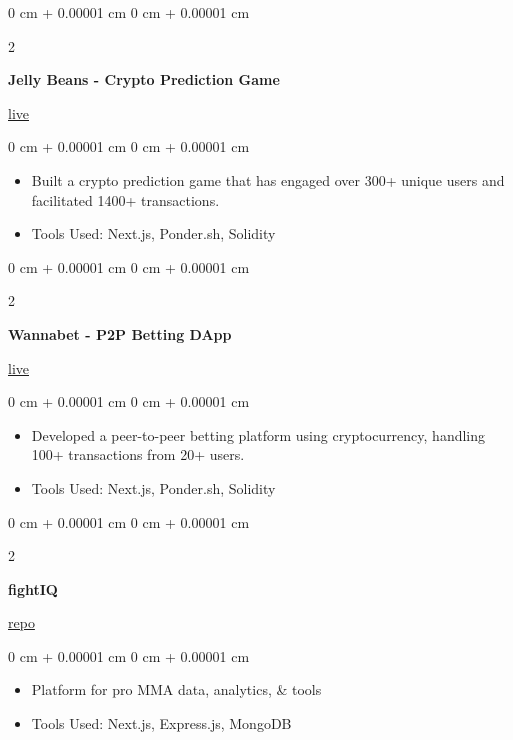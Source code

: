 \documentclass[10pt, letterpaper]{article}
\newenvironment{highlights}{
    \begin{itemize}[
        topsep=0.10 cm,
        parsep=0.10 cm,
        partopsep=0pt,
        itemsep=0pt,
        leftmargin=0 cm + 10pt
    ]
}{
    \end{itemize}
} %
\newenvironment{onecolentry}{
    \begin{adjustwidth}{
        0 cm + 0.00001 cm
    }{
        0 cm + 0.00001 cm
    }
}{
    \end{adjustwidth}
} %
\newenvironment{twocolentry}[2][]{
    \onecolentry
    \def\secondColumn{#2}
    \setcolumnwidth{\fill, 4.5 cm}
    \begin{paracol}{2}
}{
    \switchcolumn \raggedleft \secondColumn
    \end{paracol}
    \endonecolentry
} %
\begin{document}
\vspace{0.2 cm}

\begin{twocolentry}{\href{https://jellybeans.wtf}{live}}
    \textbf{Jelly Beans - Crypto Prediction Game}
\end{twocolentry}
\vspace{0.10 cm}
\begin{onecolentry}
\begin{highlights}
    \item Built a crypto prediction game that has engaged over 300+ unique users and facilitated 1400+ transactions.
\item Tools Used: Next.js, Ponder.sh, Solidity
\end{highlights}
\end{onecolentry}

\vspace{0.2 cm}

\begin{twocolentry}{\href{https://wannabet.cc}{live}}
    \textbf{Wannabet - P2P Betting DApp}
\end{twocolentry}
\vspace{0.10 cm}
\begin{onecolentry}
\begin{highlights}
    \item Developed a peer-to-peer betting platform using cryptocurrency, handling 100+ transactions from 20+ users.
    \item Tools Used: Next.js, Ponder.sh, Solidity
\end{highlights}
\end{onecolentry}

\vspace{0.2 cm}

\begin{twocolentry}{\href{https://github.com/sinaatalay/rendercv}{repo}}
    \textbf{fightIQ}
\end{twocolentry}
\vspace{0.10 cm}
\begin{onecolentry}
\begin{highlights}
    \item Platform for pro MMA data, analytics, \& tools
    \item Tools Used: Next.js, Express.js, MongoDB
\end{highlights}
\end{onecolentry}

\vspace{0.2 cm}
\end{document}
